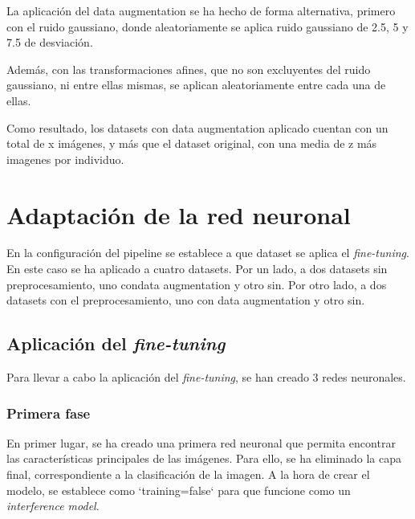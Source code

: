 La aplicación del data augmentation se ha hecho de forma alternativa, primero con el ruido gaussiano, donde aleatoriamente se aplica ruido gaussiano de 2.5, 5 y 7.5 de desviación. 

Además, con las transformaciones afines, que no son excluyentes del ruido gaussiano, ni entre ellas mismas, se aplican aleatoriamente entre cada una de ellas. 

Como resultado, los datasets con data augmentation aplicado cuentan con un total de x imágenes, y más que el dataset original, con una media de z más imagenes por individuo. 

\section{Adaptación de la red neuronal}

En la configuración del pipeline se establece a que dataset se aplica el \textit{fine-tuning}. En este caso se ha aplicado a cuatro datasets. 
Por un lado, a dos datasets sin preprocesamiento, uno condata augmentation y otro sin. Por otro lado, a dos datasets con el preprocesamiento, uno con data augmentation y otro sin. 

\subsection{Aplicación del \textit{fine-tuning}}


Para llevar a cabo la aplicación del \textit{fine-tuning}, se han creado 3 redes neuronales.

\subsubsection{Primera fase}


En primer lugar, se ha creado una primera red neuronal que permita encontrar las características principales de las imágenes.
Para ello, se ha eliminado la capa final, correspondiente a la clasificación de la imagen.
A la hora de crear el modelo, se establece como `training=false` para que funcione como un \textit{interference model}.

